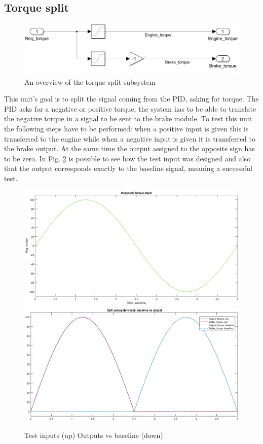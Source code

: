 \documentclass[12pt,a4paper]{report}
\begin{document}
\subsection{Torque split}
\begin{figure}[!h]
	\centering
	\includegraphics[scale=0.34]{split_subs.jpg}
	\caption{An overview of the torque split subsystem}
	\label{split_subs}
\end{figure}
This unit’s goal is to split the signal coming from the PID, asking for torque. The PID asks for a negative or positive torque, the system has to be able to translate the negative torque in a signal to be sent to the brake module. To test this unit the following steps have to be performed: when a positive input is given this is transferred to the engine while when a negative input is given it is transferred to the brake output. At the same time the output assigned to the opposite sign has to be zero.
In Fig. \ref{input_split_test} is possible to see how the test input was designed and also that the output corresponds exactly to the baseline signal, meaning a successful test.
\begin{figure}[!hbt]
	\centering
	\includegraphics[scale=0.4]{input_split_test}\hfill
	\includegraphics[scale=0.4]{out_split_test}
	\caption{Test inputs (up) Outputs vs baseline (down)}
	\label{input_split_test}
\end{figure}
\FloatBarrier
\end{document}
